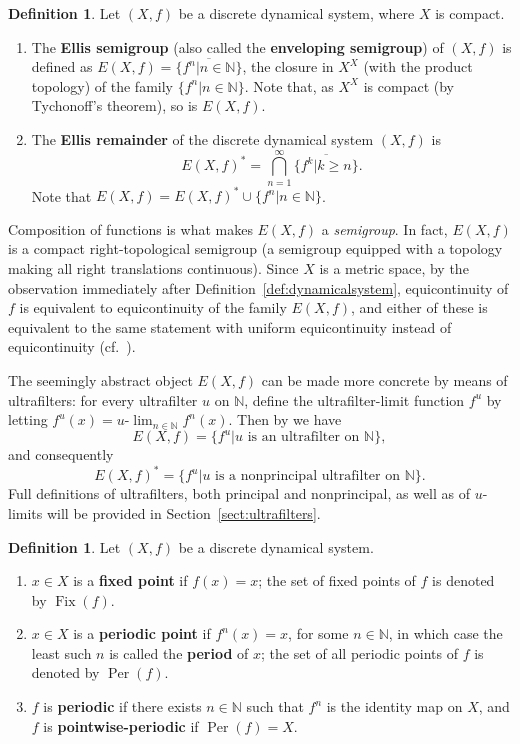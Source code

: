 \documentclass[12pt]{amsart}
\theoremstyle{definition}
\newtheorem{definition}[theorem]{Definition}
\numberwithin{equation}{section}
\DeclareMathOperator{\fix}{Fix}
\DeclareMathOperator{\per}{Per}
\begin{document}
\begin{definition}\label{def:ellis}
Let $(X,f)$ be a discrete dynamical system, where $X$ is compact.
\begin{enumerate}
\item The {\bf Ellis semigroup} (also called the {\bf enveloping semigroup}) of $(X,f)$ is defined as 
         $E(X,f)=\overline{\{f^n\big|n\in\mathbb N\}}$, the closure in $X^X$ (with the product topology) of the family 
         $\{f^n\big|n\in\mathbb N\}$. Note that, as $X^X$ is compact (by Tychonoff's theorem), so is $E(X,f)$.
\item The {\bf Ellis remainder} of the discrete dynamical system $(X,f)$ is 
         $$
         E(X,f)^*=  \bigcap_{n=1}^\infty\overline{\{f^k \big| k\geq n\}}.
         $$ 
         Note that $E(X,f) = E(X,f)^* \cup \{f^n \big|n \in \mathbb N\}$.
\end{enumerate}
\end{definition}

Composition of functions is what makes $E(X,f)$ a {\em semigroup}. In fact, $E(X,f)$ is a compact right-topological semigroup (a semigroup equipped with a topology making all right translations 
continuous). Since $X$ is a metric space, by the observation immediately after Definition~\ref{def:dynamicalsystem}, equicontinuity of $f$ is equivalent to equicontinuity of the family $E(X,f)$, and either of these is equivalent to the same statement with uniform equicontinuity instead of equicontinuity (cf.~\cite[Theorem~3.3]{garcia-sanchis}).

The seemingly abstract object $E(X,f)$ can be made more concrete by means of ultrafilters: for every ultrafilter $u$ on $\mathbb N$, define the ultrafilter-limit function $f^u$ by letting $f^u(x)=u\text{-}\lim_{n\in\mathbb N}f^n(x)$. Then by \cite[Theorem~2.2]{garcia-sanchis} we have 
$$
E(X,f)=\{f^u\big|u\text{ is an ultrafilter on }\mathbb N\},
$$
and consequently
$$
E(X,f)^*=\{f^u\big|u\text{ is a nonprincipal ultrafilter on }\mathbb N\}.
$$
Full definitions of ultrafilters, both principal and nonprincipal, as well as of $u$-limits will be provided in Section~\ref{sect:ultrafilters}. 

\begin{definition}\label{def:fix}
Let $(X,f)$ be a discrete dynamical system.
\begin{enumerate}
\item $x\in X$ is a {\bf fixed point} if $f(x)=x$; the set of fixed points of $f$ is denoted by $\fix(f).$
\item $x\in X$ is a {\bf periodic point} if $f^n(x)=x$, for some $n\in\mathbb N$, in which case the least such 
        $n$ is called the {\bf period} of $x$; the set of all periodic points of $f$ is denoted by $\per(f)$.
\item $f$ is {\bf periodic} if there exists $n \in \mathbb{N}$ such that $f^n$ is the identity map on $X$,  
         and $f$ is {\bf pointwise-periodic} if $\per(f) = X.$
\end{enumerate}
\end{definition}
\end{document}
